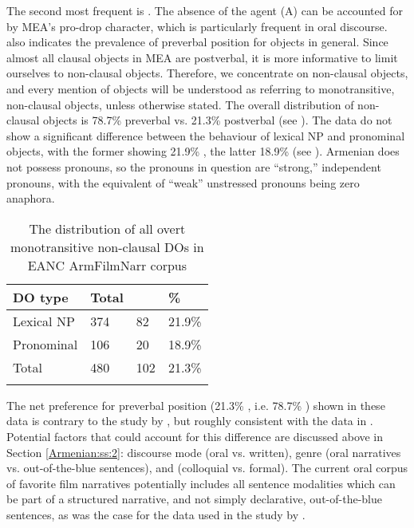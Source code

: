 \documentclass[output=paper,colorlinks,citecolor=brown,draftmode]{langscibook}
\begin{document}
The second most frequent  is . The absence of the agent (A) can be accounted for by MEA's pro-drop character, which is particularly frequent in oral discourse.   also indicates the prevalence of preverbal position for objects in general. Since almost all clausal objects in MEA are postverbal, it is more informative to limit ourselves to non-clausal objects. Therefore, we concentrate on non-clausal objects, and every mention of objects will be understood as referring to monotransitive, non-clausal objects, unless otherwise stated. The overall distribution of non-clausal objects is 78.7\% preverbal vs. 21.3\% postverbal (see ). The data do not show a significant difference between the behaviour of lexical NP and pronominal objects, with the former showing 21.9\% , the latter 18.9\%  (see ). Armenian does not possess  pronouns, so the pronouns in question are ``strong,'' independent pronouns, with the equivalent of ``weak'' unstressed pronouns being zero anaphora.

\begin{table}
    \begin{tabularx}{.8\textwidth}{XlYY}
\lsptoprule
DO type & Total &  & \%  \\
\midrule
Lexical NP & 374 & 82 & 21.9\% \\
Pronominal & 106 & 20 & 18.9\% \\
\midrule
Total & 480  & 102 & 21.3\% \\
\lspbottomrule
    \end{tabularx}
    \caption{The distribution of all overt monotransitive non-clausal DOs in EANC ArmFilmNarr corpus }
    \label{Armenian:tab:2}
\end{table}


The net preference for preverbal position (21.3\% , i.e. 78.7\% ) shown in these data is contrary to the study by \citet{samvelian_persistence_2023}, but roughly consistent with the data in \citet{stilo_preverbal_2018}. Potential factors that could account for this difference are discussed above in Section \ref{Armenian:ss:2}: discourse mode (oral vs. written), genre (oral narratives vs. out-of-the-blue sentences), and  (colloquial vs. formal). The current oral corpus of favorite film narratives potentially includes all sentence modalities which can be part of a structured narrative, and not simply declarative, out-of-the-blue sentences, as was the case for the data used in the study by \citet{samvelian_persistence_2023}. 
\end{document}
